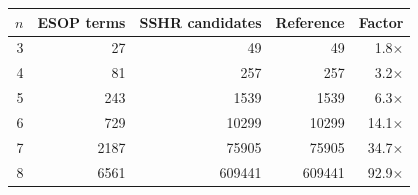 \begin{tabular}{rrrrr}
\toprule
$n$ & ESOP terms & SSHR candidates & Reference & Factor \\
\midrule
3 & 27 & 49 & 49 & 1.8$\times$ \\
4 & 81 & 257 & 257 & 3.2$\times$ \\
5 & 243 & 1539 & 1539 & 6.3$\times$ \\
6 & 729 & 10299 & 10299 & 14.1$\times$ \\
7 & 2187 & 75905 & 75905 & 34.7$\times$ \\
8 & 6561 & 609441 & 609441 & 92.9$\times$ \\
\bottomrule
\end{tabular}
